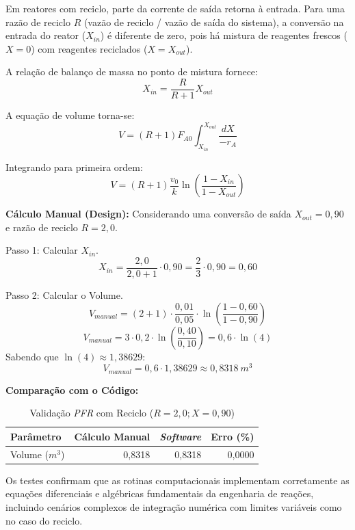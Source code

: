 Em reatores com reciclo, parte da corrente de saída retorna à entrada. Para uma razão de reciclo $R$ (vazão de reciclo / vazão de saída do sistema), a conversão na entrada do reator ($X_{in}$) é diferente de zero, pois há mistura de reagentes frescos ($X=0$) com reagentes reciclados ($X=X_{out}$).

A relação de balanço de massa no ponto de mistura fornece:
\begin{equation}
    X_{in} = \frac{R}{R+1} X_{out}
    \label{eq:val_recycle_xin}
\end{equation}

A equação de volume torna-se:
\begin{equation}
    V = (R+1) F_{A0} \int_{X_{in}}^{X_{out}} \frac{dX}{-r_A}
    \label{eq:val_recycle_vol_eq}
\end{equation}

Integrando para primeira ordem:
\begin{equation}
    V = (R+1) \frac{v_0}{k} \ln\left( \frac{1-X_{in}}{1-X_{out}} \right)
    \label{eq:val_recycle_vol_int}
\end{equation}

\textbf{Cálculo Manual (Design):}
Considerando uma conversão de saída $X_{out} = 0,90$ e razão de reciclo $R = 2,0$.

Passo 1: Calcular $X_{in}$.
\begin{equation}
    X_{in} = \frac{2,0}{2,0 + 1} \cdot 0,90 = \frac{2}{3} \cdot 0,90 = 0,60
    \label{eq:val_recycle_xin_calc}
\end{equation}

Passo 2: Calcular o Volume.
\begin{equation}
    V_{manual} = (2 + 1) \cdot \frac{0,01}{0,05} \cdot \ln\left( \frac{1 - 0,60}{1 - 0,90} \right)
    \label{eq:val_recycle_vol_calc_1}
\end{equation}
\begin{equation}
    V_{manual} = 3 \cdot 0,2 \cdot \ln\left( \frac{0,40}{0,10} \right) = 0,6 \cdot \ln(4)
    \label{eq:val_recycle_vol_calc_2}
\end{equation}
Sabendo que $\ln(4) \approx 1,38629$:
\begin{equation}
    V_{manual} = 0,6 \cdot 1,38629 \approx 0,8318 \ m^3
    \label{eq:val_recycle_vol_calc_3}
\end{equation}

\textbf{Comparação com o Código:}
\begin{table}[H]
    \centering
    \caption{Validação \textit{PFR} com Reciclo ($R=2,0; X=0,90$)}
    \begin{tabular}{lrrr}
        \toprule
        \textbf{Parâmetro} & \textbf{Cálculo Manual} & \textbf{\textit{Software}} & \textbf{Erro (\%)} \\
        \midrule
        Volume ($m^3$) & 0,8318 & 0,8318 & 0,0000 \\
        \bottomrule
    \end{tabular}
\end{table}

Os testes confirmam que as rotinas computacionais implementam corretamente as equações diferenciais e algébricas fundamentais da engenharia de reações, incluindo cenários complexos de integração numérica com limites variáveis como no caso do reciclo.
